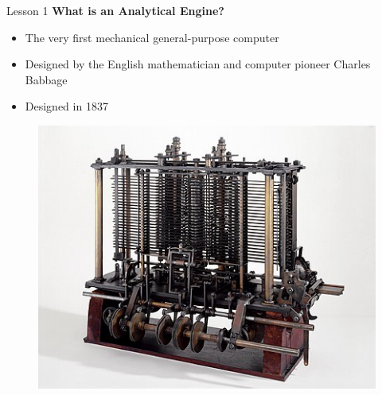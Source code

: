 \documentclass[aspectratio=1610]{beamer}
\begin{document}
\begin{frame}{Lesson 1}{}
{\Large\textbf{{What is an Analytical Engine?}}}
\Large
\begin{minipage}{0.55\textwidth}
    \begin{itemize}
      \item The very first mechanical general-purpose computer
      \item Designed by the English mathematician and computer pioneer Charles Babbage
      \item Designed in 1837
    \end{itemize}
  \end{minipage}
\begin{minipage}{0.35\textwidth}
      \begin{figure}
        \includegraphics[scale=0.45]{Images/Babbages_AnalyticalEngine}
      \end{figure}
  \end{minipage}  
\end{frame}
\end{document}
